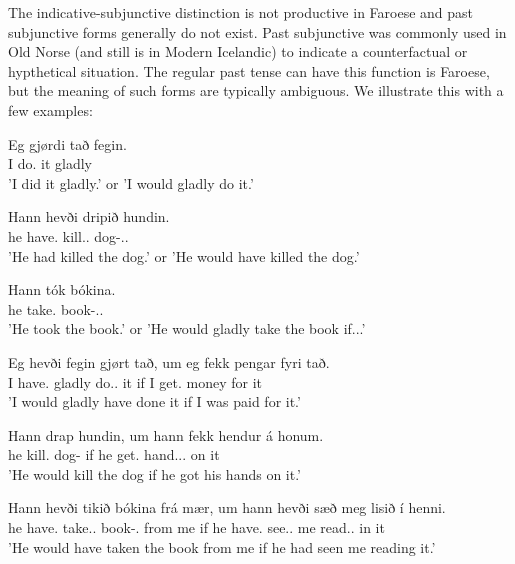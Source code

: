 \documentclass[12pt,%
    times,
]{lin-v2/lin}
\begin{document}
The indicative-subjunctive distinction is not productive in Faroese and past subjunctive forms generally do not exist.
Past subjunctive was commonly used in Old Norse (and still is in Modern Icelandic) to indicate a counterfactual or hypthetical
situation. The regular past tense can have this function is Faroese, but the meaning of such forms are typically
ambiguous. We illustrate this with a few examples:
\begin{exe}
    \ex
    \begin{xlist}
        \item \gll Eg gjørdi tað fegin.\\
        I do.\Pst{} it gladly\\
        \trans 'I did it gladly.' or 'I would gladly do it.'
        \item \gll Hann hevði dripið hundin.\\
        he have.\Pst{} kill.\Pst.\Ptcp{} dog-\Det.\Acc.\M{}\\
        \trans 'He had killed the dog.' or 'He would have killed the dog.'
        \item \gll Hann tók bókina.\\
        he take.\Pst{} book-\Det.\Nom.\F{}\\
        \trans 'He took the book.' or 'He would gladly take the book if...'
        \item \gll Eg hevði fegin gjørt tað, um eg fekk pengar fyri tað.\\
        I have.\Pst{} gladly do.\Pst.\Ptcp{} it if I get.\Pst{} money for it\\
        \trans 'I would gladly have done it if I was paid for it.'
        \item \gll Hann drap hundin, um hann fekk hendur á honum.\\
        he kill.\Pst{} dog-\Det{} if he get.\Pst{} hand.\Nom.\Pl. on it\\
        \trans 'He would kill the dog if he got his hands on it.'
        \item \gll Hann hevði tikið bókina frá mær, um hann hevði sæð meg lisið í henni.\\
        he have.\Pst{} take.\Pst.\Ptcp{} book-\Det{}.\Nom{} from me if he have.\Pst{} see.\Pst.\Ptcp{} me read.\Pst.\Ptcp{} in it\\
        \trans 'He would have taken the book from me if he had seen me reading it.'
    \end{xlist}
\end{exe}
\end{document}
